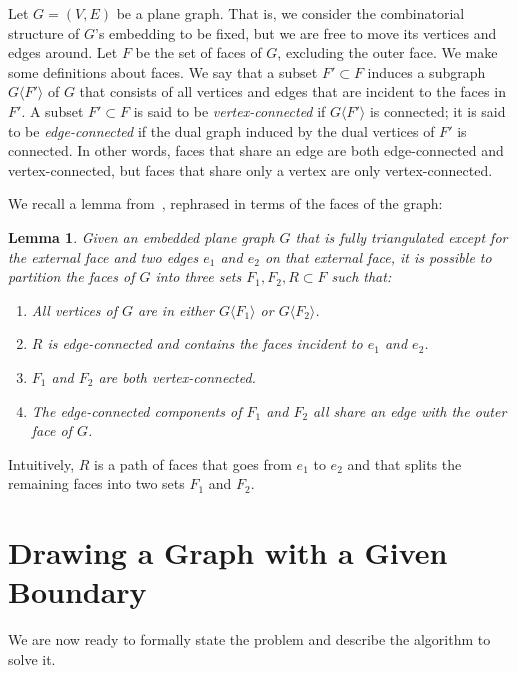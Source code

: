 \documentclass[11pt]{article}
\newcommand {\fsg} [1] {\ensuremath {G \langle #1 \rangle}}
\newtheorem {lemma} {Lemma}
\begin{document}
    Let $G=(V,E)$ be a plane graph.
    That is, we consider the combinatorial structure of $G$'s
    embedding to be fixed,
    but we are free to move its vertices and edges around.
    Let $F$ be the set of faces of $G$, excluding the outer face.
We make some definitions about faces.
    We say that a subset $F' \subset F$ induces a subgraph $\fsg {F'}$ of $G$
    that consists of all vertices and edges that are incident to the faces
    in $F'$.
    A subset $F' \subset F$ is said to be \emph {vertex-connected} if $\fsg {F'}$
    is connected; it is said to be \emph {edge-connected} if the dual graph
    induced by the dual vertices of $F'$ is connected. In other words, faces
    that share an edge are both edge-connected and vertex-connected, but faces
    that share only a vertex are only vertex-connected.



    We recall a lemma from~\cite{duncan},
    rephrased in terms of the faces of the
    graph:

    \begin{lemma}
    \label{lem:river}
      Given an embedded plane graph $G$ that is fully triangulated except for the
      external face and two edges $e_1$ and $e_2$ on that external face,
      it is possible to partition the faces of $G$ into three sets
      $F_1, F_2, R \subset F$
      such that:
      \begin{enumerate}
        \item All vertices of $G$ are in either \fsg {F_1} or \fsg {F_2}.
        \item $R$ is edge-connected and contains the faces incident to $e_1$
          and $e_2$.
        \item $F_1$ and $F_2$ are both vertex-connected.
        \item The edge-connected components of $F_1$ and $F_2$ all share an edge
          with the outer face of $G$.
      \end{enumerate}
    \end{lemma}


    Intuitively, $R$ is a path of faces that goes from $e_1$ to $e_2$ and that
    splits the remaining faces into two sets $F_1$ and $F_2$.



\section {Drawing a Graph with a Given Boundary}

  We are now ready to formally state the problem and describe the algorithm to
  solve it.
\end{document}
